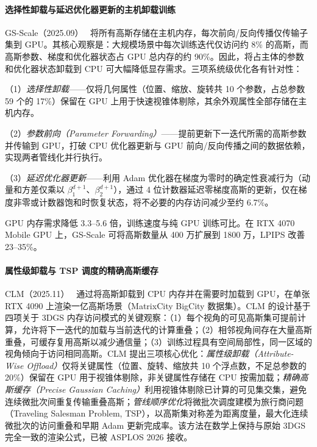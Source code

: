 \paragraph{选择性卸载与延迟优化器更新的主机卸载训练}

GS-Scale（2025.09）~\cite{2509_15645} 将所有高斯存储在主机内存，每次前向/反向传播仅传输子集到 GPU。其核心观察是：大规模场景中每次训练迭代仅访问约 8\% 的高斯，而高斯参数、梯度和优化器状态占 GPU 总内存的约 90\%。因此，将占主体的参数和优化器状态卸载到 CPU 可大幅降低显存需求。三项系统级优化各有针对性：

（1）\emph{选择性卸载}——仅将几何属性（位置、缩放、旋转共 10 个参数，占总参数 59 个的 17\%）保留在 GPU 上用于快速视锥体剔除，其余外观属性全部存储在主机内存。

（2）\emph{参数前向（Parameter Forwarding）}——提前更新下一迭代所需的高斯参数并传输到 GPU，打破 CPU 优化器更新与 GPU 前向/反向传播之间的数据依赖，实现两者管线化并行执行。

（3）\emph{延迟优化器更新}——利用 Adam 优化器在梯度为零时的确定性衰减行为（动量和方差仅乘以 $\beta_1^{d+1}$、$\beta_2^{d+1}$），通过 4 位计数器延迟零梯度高斯的更新，仅在梯度非零或计数器饱和时恢复状态，将不必要的内存访问减少至约 6.7\%。

GPU 内存需求降低 3.3--5.6 倍，训练速度与纯 GPU 训练可比。在 RTX 4070 Mobile GPU 上，GS-Scale 可将高斯数量从 400 万扩展到 1800 万，LPIPS 改善 23--35\%。

\paragraph{属性级卸载与 TSP 调度的精确高斯缓存}

CLM（2025.11）~\cite{2511_04951} 通过将高斯卸载到 CPU 内存并在需要时加载到 GPU，在单张 RTX 4090 上渲染一亿高斯场景（MatrixCity BigCity 数据集）。CLM 的设计基于四项关于 3DGS 内存访问模式的关键观察：（1）每个视角的可见高斯集可提前计算，允许将下一迭代的加载与当前迭代的计算重叠；（2）相邻视角间存在大量高斯重叠，可缓存复用高斯以减少通信量；（3）训练过程具有空间局部性，同一区域的视角倾向于访问相同高斯。CLM 提出三项核心优化：\emph{属性级卸载（Attribute-Wise Offload）}仅将关键属性（位置、旋转、缩放共 10 个浮点数，不足总参数的 20\%）保留在 GPU 用于视锥体剔除，非关键属性存储在 CPU 按需加载；\emph{精确高斯缓存（Precise Gaussian Caching）}利用视锥体剔除已计算的可见集交集，避免连续微批次间重复传输重叠高斯；\emph{管线顺序优化}将微批次调度建模为旅行商问题（Traveling Salesman Problem, TSP），以高斯集对称差为距离度量，最大化连续微批次的访问重叠和早期 Adam 更新完成率。该方法在数学上保持与原始 3DGS 完全一致的渲染公式，已被 ASPLOS 2026 接收。

